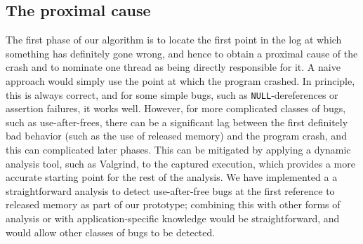 \documentclass[10pt,twocolumn,preprint,natbib,authoryear]{sigplanconf}
\newcommand{\editorial}[1]{}
\begin{document}

\subsection{The proximal cause}
\label{sect:prox_cause}
The first phase of our algorithm is to locate the first point in the
log at which something has definitely gone wrong, and hence to obtain
a proximal cause of the crash and to nominate one thread as being
directly responsible for it.  A naive approach would simply use the
point at which the program crashed.  In principle, this is always
correct, and for some simple bugs, such as \verb|NULL|-dereferences or
assertion failures, it works well.  However, for more complicated
classes of bugs, such as use-after-frees, there can be a significant
lag between the first definitely bad behavior (such as the use of
released memory) and the program crash, and this can complicated later
phases.  This can be mitigated by applying a dynamic analysis tool,
such as Valgrind\cite{Nethercote2007}, to the captured execution,
which provides a more accurate starting point for the rest of the
analysis.  We have implemented a a straightforward analysis to detect
use-after-free bugs at the first reference to released memory as part
of our prototype; combining this with other forms of analysis or with
application-specific knowledge would be straightforward, and would
allow other classes of bugs to be detected.
\end{document}
